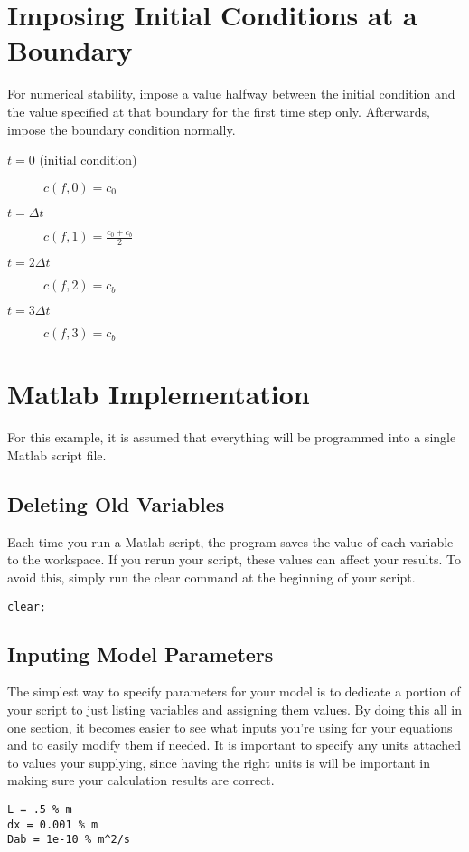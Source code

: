 \documentclass[11pt]{article}
\begin{document}
\section{Imposing Initial Conditions at a Boundary}
For numerical stability, impose a value halfway between the initial condition
and the value specified at that boundary for the first time step only.
Afterwards, impose the boundary condition normally.
\begin{description}
\item[$t=0$ (initial condition)] $c(f,0) = c_0$
\item[$t=\Delta t$] $c(f,1) = \frac{c_0+c_b}{2}$
\item[$t=2\Delta t$] $c(f,2) = c_b$
\item[$t=3\Delta t$] $c(f,3) = c_b$
\end{description}

\section{Matlab Implementation}
For this example, it is assumed that everything will be programmed into a single Matlab script file.
\subsection{Deleting Old Variables}
Each time you run a Matlab script, the program saves the value of each variable to the workspace. If you rerun your script, these values can affect your results. To avoid this, simply run the clear command at the beginning of your script.
\begin{lstlisting}
clear;
\end{lstlisting}
\subsection{Inputing Model Parameters}
The simplest way to specify parameters for your model is to dedicate a
portion of your script to just listing variables and assigning them values. By
doing this all in one section, it becomes easier to see what inputs you're
using for your equations and to easily modify them if needed. It is important
to specify any units attached to values your supplying, since having the right
units is will be important in making sure your calculation results are correct.
\begin{lstlisting}
L = .5 % m
dx = 0.001 % m
Dab = 1e-10 % m^2/s
\end{lstlisting}
\end{document}
